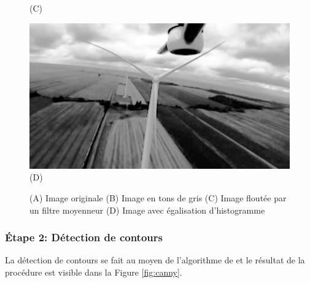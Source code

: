 \begin{figure}[htp]
\begin{minipage}{0.49\textwidth}
  (C)
\end{minipage}
\begin{minipage}{0.49\textwidth}
  \centering
  \includegraphics[width=\linewidth]{images/preprocess_histogram.png}
  (D)
\end{minipage}
\caption{(A) Image originale (B) Image en tons de gris (C) Image floutée par un filtre moyenneur (D) Image avec égalisation d'histogramme}
\label{fig:detection_pretraitement}
\end{figure}

\subsubsection{Étape 2: Détection de contours}
La détection de contours se fait au moyen de l'algorithme de \citep{Canny1986} et le résultat de la procédure est visible dans la Figure \ref{fig:canny}.

